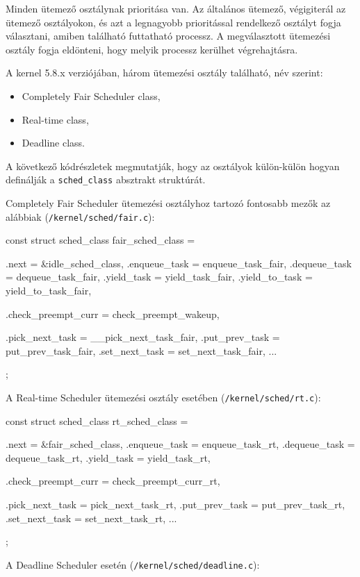 Minden ütemező osztálynak prioritása van. 
Az általános ütemező, végigiterál az ütemező osztályokon, és azt a legnagyobb prioritással rendelkező osztályt fogja választani, amiben található futtatható processz. A megválasztott ütemezési osztály fogja eldönteni, hogy melyik processz kerülhet végrehajtásra.

A kernel 5.8.x verziójában, három ütemezési osztály található, név szerint: 
\begin{itemize}
	 \item Completely Fair Scheduler class,
	 \item Real-time class,
	 \item Deadline class.
\end{itemize}
A következő kódrészletek megmutatják, hogy az osztályok külön-külön hogyan definálják a \texttt{sched\_class} absztrakt struktúrát.

Completely Fair Scheduler ütemezési osztályhoz tartozó fontosabb mezők az alábbiak (\texttt{/kernel/sched/fair.c}):

\begin{cpp}
const struct sched_class fair_sched_class = {
	.next			= &idle_sched_class,
	.enqueue_task		= enqueue_task_fair,
	.dequeue_task		= dequeue_task_fair,
	.yield_task		= yield_task_fair,
	.yield_to_task		= yield_to_task_fair,

	.check_preempt_curr	= check_preempt_wakeup,

	.pick_next_task		= __pick_next_task_fair,
	.put_prev_task		= put_prev_task_fair,
	.set_next_task          = set_next_task_fair,
...
};
\end{cpp}

A Real-time Scheduler ütemezési osztály esetében (\texttt{/kernel/sched/rt.c}):

\begin{cpp}
const struct sched_class rt_sched_class = {
	.next			= &fair_sched_class,
	.enqueue_task		= enqueue_task_rt,
	.dequeue_task		= dequeue_task_rt,
	.yield_task		= yield_task_rt,

	.check_preempt_curr	= check_preempt_curr_rt,

	.pick_next_task		= pick_next_task_rt,
	.put_prev_task		= put_prev_task_rt,
	.set_next_task          = set_next_task_rt,
...
};
\end{cpp}

A Deadline Scheduler esetén (\texttt{/kernel/sched/deadline.c}):

